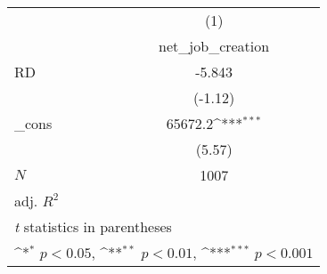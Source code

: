 {
\def\sym#1{\ifmmode^{#1}\else\(^{#1}\)\fi}
\begin{tabular}{l*{1}{c}}
\toprule
            &\multicolumn{1}{c}{(1)}\\
            &\multicolumn{1}{c}{net\_job\_creation}\\
\midrule
RD          &      -5.843         \\
            &     (-1.12)         \\
\addlinespace
\_cons      &     65672.2\sym{***}\\
            &      (5.57)         \\
\midrule
\(N\)       &        1007         \\
adj. \(R^{2}\)&                     \\
\bottomrule
\multicolumn{2}{l}{\footnotesize \textit{t} statistics in parentheses}\\
\multicolumn{2}{l}{\footnotesize \sym{*} \(p<0.05\), \sym{**} \(p<0.01\), \sym{***} \(p<0.001\)}\\
\end{tabular}
}
